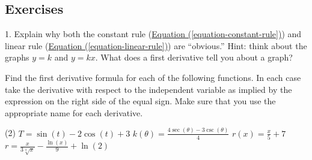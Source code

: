 \documentclass[10pt,oneside,]{book}
\theoremstyle{plain}
\theoremstyle{definition}
\numberwithin{equation}{section}
\newcommand{\fe}[2]{#1\mathopen{}\left(#2\right)\mathclose{}}
\begin{document}
\subsection[Exercises]{Exercises}\label{exercises-36}
\begin{exerciselist}
\item[1.]\hypertarget{exercise-366}{\null}Explain why both the constant rule (\hyperref[equation-constant-rule]{Equation (\ref{equation-constant-rule})}) and linear rule (\hyperref[equation-linear-rule]{Equation (\ref{equation-linear-rule})}) are ``obvious.'' Hint: think about the graphs \(y=k\) and \(y=kx\).  What does a first derivative tell you about a graph?%
\par\smallskip
\end{exerciselist}
Find the first derivative formula for each of the following functions.  In each case take the derivative with respect to the independent variable as implied by the expression on the right side of the equal sign.  Make sure that you use the appropriate name for each derivative.%
\par
\begin{exercisegroup}(2)
\exercise[2.]\hypertarget{exercise-367}{\null}\(T=\fe{\sin}{t}-2\fe{\cos}{t}+3\)%
\exercise[3.]\hypertarget{exercise-368}{\null}\(\fe{k}{\theta}=\frac{4\fe{\sec}{\theta}-3\fe{\csc}{\theta}}{4}\)%
\exercise[4.]\hypertarget{exercise-369}{\null}\(\fe{r}{x}=\frac{x}{5}+7\)%
\exercise[5.]\hypertarget{exercise-370}{\null}\(r=\frac{x}{3\sqrt[3]{x}}-\frac{\fe{\ln}{x}}{9}+\fe{\ln}{2}\)%
\end{exercisegroup}
\par\smallskip\noindent
\typeout{************************************************}
\typeout{************************************************}
\end{document}
